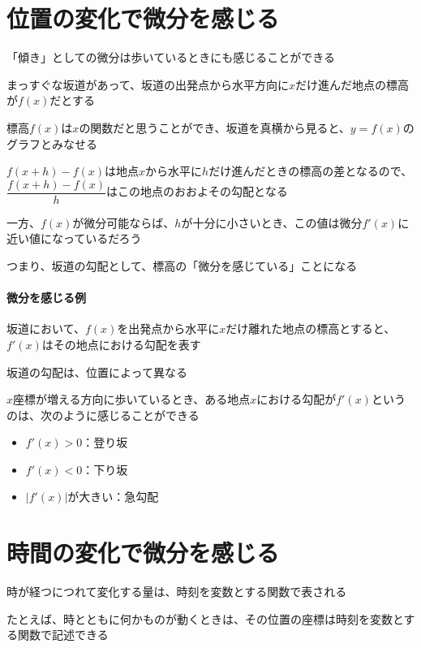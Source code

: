 \documentclass[../book_jiriki_calc]{subfiles}
\begin{document}
\section{位置の変化で微分を感じる}

「傾き」としての微分は歩いているときにも感じることができる

\br

まっすぐな坂道があって、坂道の出発点から水平方向に$x$だけ進んだ地点の標高が$f(x)$だとする

標高$f(x)$は$x$の関数だと思うことができ、坂道を真横から見ると、$y=f(x)$のグラフとみなせる

\br

$f(x+h)-f(x)$は地点$x$から水平に$h$だけ進んだときの標高の差となるので、$\dfrac{f(x+h)-f(x)}{h}$はこの地点のおおよその勾配となる

一方、$f(x)$が微分可能ならば、$h$が十分に小さいとき、この値は微分$f'(x)$に近い値になっているだろう

\br

つまり、坂道の勾配として、標高の「微分を感じている」ことになる

\br

\paragraph{微分を感じる例}

坂道において、$f(x)$を出発点から水平に$x$だけ離れた地点の標高とすると、$f'(x)$はその地点における勾配を表す

\sectionline

坂道の勾配は、位置によって異なる

$x$座標が増える方向に歩いているとき、ある地点$x$における勾配が$f'(x)$というのは、次のように感じることができる
\begin{itemize}
  \item $f'(x)>0$：登り坂
  \item $f'(x)<0$：下り坂
  \item $\left|f'(x)\right|$が大きい：急勾配
\end{itemize}

\section{時間の変化で微分を感じる}

時が経つにつれて変化する量は、時刻を変数とする関数で表される

たとえば、時とともに何かものが動くときは、その位置の座標は時刻を変数とする関数で記述できる
\end{document}
